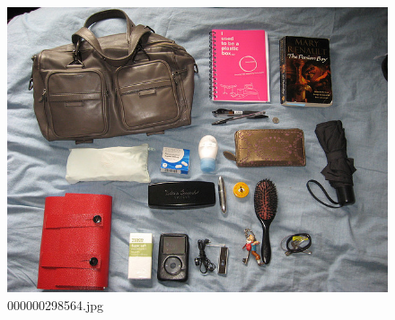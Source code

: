 \begin{figure}[h]
    \centering
    \includegraphics[width=0.8\linewidth]{../image set/hard/000000298564.jpg}
    \caption{000000298564.jpg}
\end{figure}

